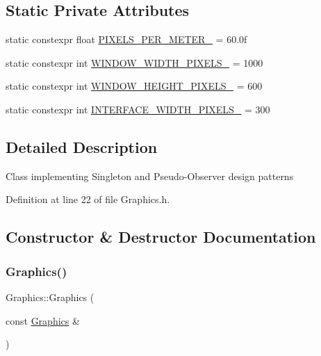 \subsection*{Static Private Attributes}
\begin{DoxyCompactItemize}
\item 
static constexpr float \hyperlink{classGraphics_af9c6251065c2900d0a92380c2bea26b2}{P\+I\+X\+E\+L\+S\+\_\+\+P\+E\+R\+\_\+\+M\+E\+T\+E\+R\+\_\+} = 60.\+0f
\item 
static constexpr int \hyperlink{classGraphics_a4e8cd4a9f4799e3b7f5e85685d6d4905}{W\+I\+N\+D\+O\+W\+\_\+\+W\+I\+D\+T\+H\+\_\+\+P\+I\+X\+E\+L\+S\+\_\+} = 1000
\item 
static constexpr int \hyperlink{classGraphics_a2838b79511d56711b88e677ad48c54e9}{W\+I\+N\+D\+O\+W\+\_\+\+H\+E\+I\+G\+H\+T\+\_\+\+P\+I\+X\+E\+L\+S\+\_\+} = 600
\item 
static constexpr int \hyperlink{classGraphics_aac15ea113ea8c69d5e54996513886110}{I\+N\+T\+E\+R\+F\+A\+C\+E\+\_\+\+W\+I\+D\+T\+H\+\_\+\+P\+I\+X\+E\+L\+S\+\_\+} = 300
\end{DoxyCompactItemize}


\subsection{Detailed Description}
Class implementing Singleton and Pseudo-\/\+Observer design patterns 

Definition at line 22 of file Graphics.\+h.



\subsection{Constructor \& Destructor Documentation}
\mbox{\label{classGraphics_abe2f13f24a1d35c55fdac10a282744eb}} 
\subsubsection{\texorpdfstring{Graphics()}{Graphics()}\hspace{0.1cm}{\footnotesize\ttfamily [1/2]}}
{\footnotesize\ttfamily Graphics\+::\+Graphics (\begin{DoxyParamCaption}\item[{const \hyperlink{classGraphics}{Graphics} \&}]{ }\end{DoxyParamCaption})\hspace{0.3cm}{\ttfamily [delete]}}

